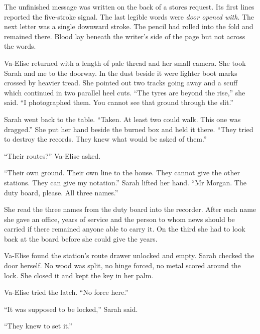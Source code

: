 The unfinished message was written on the back of a stores request. Its first lines reported the five-stroke signal. The last legible words were \emph{door opened with}. The next letter was a single downward stroke. The pencil had rolled into the fold and remained there. Blood lay beneath the writer's side of the page but not across the words.\par

Va-Elise returned with a length of pale thread and her small camera. She took Sarah and me to the doorway. In the dust beside it were lighter boot marks crossed by heavier tread. She pointed out two tracks going away and a scuff which continued in two parallel heel cuts. ``The tyres are beyond the rise,'' she said. ``I photographed them. You cannot see that ground through the slit.''\par

Sarah went back to the table. ``Taken. At least two could walk. This one was dragged.'' She put her hand beside the burned box and held it there. ``They tried to destroy the records. They knew what would be asked of them.''\par

``Their routes?'' Va-Elise asked.\par

``Their own ground. Their own line to the house. They cannot give the other stations. They can give my notation.'' Sarah lifted her hand. ``Mr Morgan. The duty board, please. All three names.''\par

She read the three names from the duty board into the recorder. After each name she gave an office, years of service and the person to whom news should be carried if there remained anyone able to carry it. On the third she had to look back at the board before she could give the years.\par

Va-Elise found the station's route drawer unlocked and empty. Sarah checked the door herself. No wood was split, no hinge forced, no metal scored around the lock. She closed it and kept the key in her palm.\par

Va-Elise tried the latch. ``No force here.''\par

``It was supposed to be locked,'' Sarah said.\par

``They knew to set it.''\par

